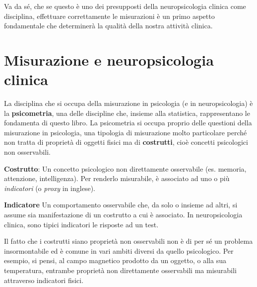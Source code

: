 \documentclass[
  italian,
  letterpaper,
  paper=6in:9in,
  pagesize=pdftex,
  headinclude=on,
  footinclude=on,
  11pt]{scrbook}
\begin{document}
Va da sé, che se questo è uno dei presupposti della neuropsicologia
clinica come disciplina, effettuare correttamente le misurazioni è un
primo aspetto fondamentale che determinerà la qualità della nostra
attività clinica.

\section{Misurazione e neuropsicologia
clinica}\label{misurazione_e_neuropsicologia_clinica}

La disciplina che si occupa della misurazione in psicologia (e in
neuropsicologia) è la \textbf{psicometria}, una delle discipline che,
insieme alla statistica, rappresentano le fondamenta di questo libro. La
psicometria si occupa proprio delle questioni della misurazione in
psicologia, una tipologia di misurazione molto particolare perché non
tratta di proprietà di oggetti fisici ma di \textbf{costrutti}, cioè
concetti psicologici non osservabili.

\begin{tcolorbox}[enhanced jigsaw, title=\textcolor{quarto-callout-note-color}{\faInfo}\hspace{0.5em}{Definizione}, coltitle=black, bottomtitle=1mm, colback=white, bottomrule=.15mm, rightrule=.15mm, breakable, toptitle=1mm, left=2mm, colbacktitle=quarto-callout-note-color!10!white, titlerule=0mm, colframe=quarto-callout-note-color-frame, leftrule=.75mm, opacitybacktitle=0.6, arc=.35mm, toprule=.15mm, opacityback=0]

\textbf{Costrutto}: Un concetto psicologico non direttamente osservabile
(es. memoria, attenzione, intelligenza). Per renderlo misurabile, è
associato ad uno o più \emph{indicatori} (o \emph{proxy} in inglese).
\vspace{1em}

\textbf{Indicatore} Un comportamento osservabile che, da solo o insieme
ad altri, si assume sia manifestazione di un costrutto a cui è
associato. In neuropsicologia clinica, sono tipici indicatori le
risposte ad un test.

\end{tcolorbox}

Il fatto che i costrutti siano proprietà non osservabili non è di per sé
un problema insormontabile ed è comune in vari ambiti diversi da quello
psicologico. Per esempio, si pensi, al campo magnetico prodotto da un
oggetto, o alla sua temperatura, entrambe proprietà non direttamente
osservabili ma misurabili attraverso indicatori fisici.
\end{document}
